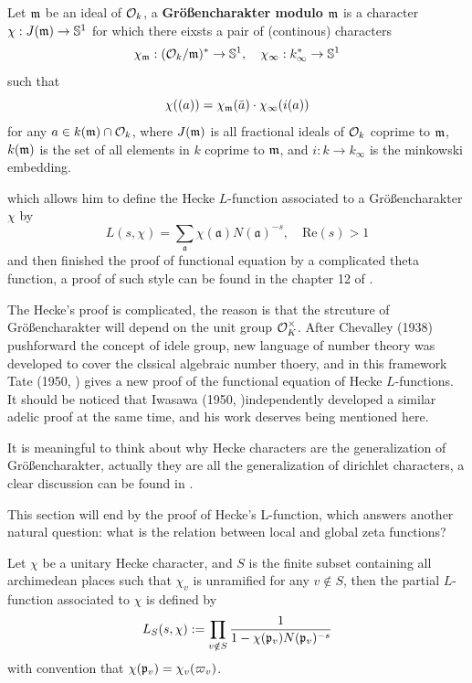 \begin{definition}
        Let \(\mathfrak{m}\) be an ideal of \(\mathcal{O}_k\), a \textbf{Größencharakter modulo \(\mathfrak{m}\)} is a character \(\chi: J(\mathfrak{m}) \to \mathbb{S}^1\) for which there eixsts a pair of (continous) characters
    \[\chi_{\mathfrak{m}}: (\mathcal{O}_k/\mathfrak{m})^* \to \mathbb{S}^1, \quad \chi_{\infty}: k_{\infty}^* \to \mathbb{S}^1\]
    such that
    \[\chi((a)) = \chi_{\mathfrak{m}}(\bar{a}) \cdot \chi_{\infty}(i(a))\]
    for any \(a \in k(\mathfrak{m}) \cap \mathcal{O}_k\), where \(J(\mathfrak{m})\) is all fractional ideals of \(\mathcal{O}_k\) coprime to \(\mathfrak{m}\), \(k(\mathfrak{m})\) is the set of all elements in \(k\) coprime to \(\mathfrak{m}\), and \(i: k \to k_{\infty}\) is the minkowski embedding.
\end{definition}
which allows him to define the Hecke \(L\)-function associated to a Größencharakter \(\chi\) by
\[L(s,\chi) = \sum_{\mathfrak{a}} \chi(\mathfrak{a}) N(\mathfrak{a})^{-s}, \quad \mathrm{Re}(s)>1\]
and then finished the proof of functional equation by a complicated theta function, a proof of such style can be found in the chapter 12 of \cite{lang1994algebraic}.

The Hecke's proof is complicated, the reason is that the strcuture of Größencharakter will depend on the unit group \(\mathcal{O}_K^\times\). After Chevalley (1938) pushforward the concept of idele group, new language of number theory was developed to cover the clssical algebraic number thoery, and in this framework Tate (1950, \cite{TateCasselsFrohlich}) gives a new proof of the functional equation of Hecke \(L\)-functions. It should be noticed that Iwasawa (1950, \cite{iwasawa2019hecke})independently developed a similar adelic proof at the same time, and his work  deserves being mentioned here.

It is meaningful to think about why Hecke characters are the generalization of Größencharakter, actually they are all the generalization of dirichlet characters, a clear discussion can be found in \cite{Raghuram2022}.

This section will end by the proof of Hecke's L-function, which answers another natural question: what is the relation between local and global zeta functions? 

\begin{definition}
    Let \(\chi\) be a unitary Hecke character, and \(S\) is the finite subset containing all archimedean places such that \(\chi_v\) is unramified for any \(v \notin S\), then the partial \(L\)-function associated to \(\chi\) is defined by 
    \[L_S(s,\chi) := \prod_{v \notin S}\frac{1}{1-\chi(\mathfrak{p}_v)N(\mathfrak{p}_v)^{-s}}\]
    with convention that \(\chi(\mathfrak{p}_v) = \chi_v(\varpi_v)\).
\end{definition}

